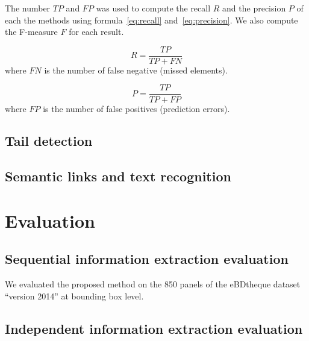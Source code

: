 The number $TP$ and $FP$ was used to compute the recall $R$ and the precision $P$ of each the methods using formula~\ref{eq:recall} and~\ref{eq:precision}.
We also compute the F-measure $F$ for each result.

\begin{equation}
\label{eq:recall}
  R = \frac{TP}{TP + FN}
\end{equation}
where $FN$ is the number of false negative (missed elements).

\begin{equation}
\label{eq:precision}
  P = \frac{TP}{TP + FP}
\end{equation}
where $FP$ is the number of false positives (prediction errors).

\subsection{Tail detection} %
\label{sub:ex:tail_detection}

\subsection{Semantic links and text recognition} %
\label{sub:ex:semantic_links_and_text_recognition}




\section{Evaluation} %
\label{sec:ex:evaluation}
\subsection{Sequential information extraction evaluation} %
\label{sub:ex:sequential_information_extraction_evaluation}
We evaluated the proposed method on the 850 panels of the eBDtheque dataset~\cite{Guerin2013} ``version 2014'' at bounding box level.

\subsection{Independent information extraction evaluation} %
\label{sub:ex:independent_information_extraction_evaluation}

